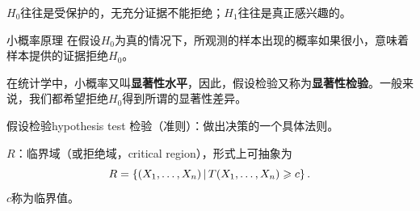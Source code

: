 $H_0$往往是受保护的，无充分证据不能拒绝；$H_1$往往是真正感兴趣的。
\begin{theorem}{小概率原理}{}
	在假设$H_0$为真的情况下，所观测的样本出现的概率如果很小，意味着样本提供的证据拒绝$H_0$。
\end{theorem}
在统计学中，小概率又叫\textbf{显著性水平}，因此，假设检验又称为\textbf{显著性检验}。一般来说，我们都希望拒绝$H_0$得到所谓的显著性差异。
\begin{definition}{假设检验}{hypothesis test}
	检验（准则）：做出决策的一个具体法则。

	$R$：临界域（或拒绝域，critical region），形式上可抽象为
	\[
		R=\left\{(X_1,\ldots,X_n)\,\middle\vert\,T(X_1,\ldots,X_n)\geqslant c\right\}.
	\]
	$c$称为临界值。
\end{definition}


